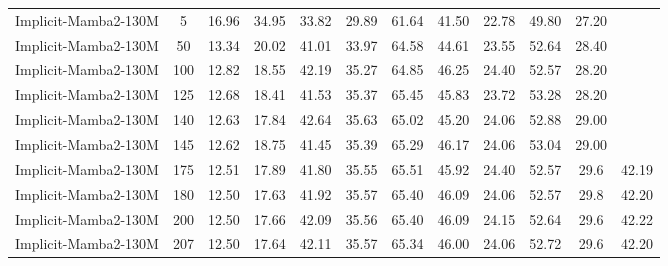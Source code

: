 \begin{table}[h]
{\begin{tabular}{lccccccccccc}
            \bottomrule
            Implicit-Mamba2-130M & 5 & 16.96 & 34.95 & 33.82 & 29.89 & 61.64 & 41.50 & 22.78 & 49.80 & 27.20 & \\ 
            Implicit-Mamba2-130M & 50 & 13.34 & 20.02 & 41.01 & 33.97 & 64.58 & 44.61 & 23.55 & 52.64 & 28.40 & \\
            Implicit-Mamba2-130M & 100 & 12.82 & 18.55 & 42.19 & 35.27 & 64.85 & 46.25 & 24.40 & 52.57 & 28.20 & \\
            Implicit-Mamba2-130M & 125 & 12.68 & 18.41 & 41.53 & 35.37 & 65.45 & 45.83 & 23.72 & 53.28 & 28.20 & \\ 
            Implicit-Mamba2-130M & 140 & 12.63 & 17.84 & 42.64 & 35.63 & 65.02 & 45.20 & 24.06 & 52.88 & 29.00 & \\
            
            Implicit-Mamba2-130M & 145 & 12.62 & 18.75 & 41.45 & 35.39 & 65.29 & 46.17 & 24.06 & 53.04 & 29.00 & \\
            \bottomrule
            Implicit-Mamba2-130M & 175 & 12.51 & 17.89 & 41.80 & 35.55 & 65.51 & 45.92 & 24.40 & 52.57 & 29.6 & 42.19\\  
            Implicit-Mamba2-130M & 180 & 12.50 & 17.63 & 41.92 & 35.57 & 65.40 & 46.09 & 24.06 & 52.57 & 29.8 & 42.20\\  
            Implicit-Mamba2-130M & 200 & 12.50 & 17.66 & 42.09 & 35.56 & 65.40 & 46.09 & 24.15 & 52.64 & 29.6 & 42.22\\  
            Implicit-Mamba2-130M & 207 & 12.50 & 17.64 & 42.11 & 35.57 & 65.34 & 46.00 & 24.06 & 52.72 & 29.6 & 42.20\\ 
            \bottomrule


\end{tabular}}
\end{table}
